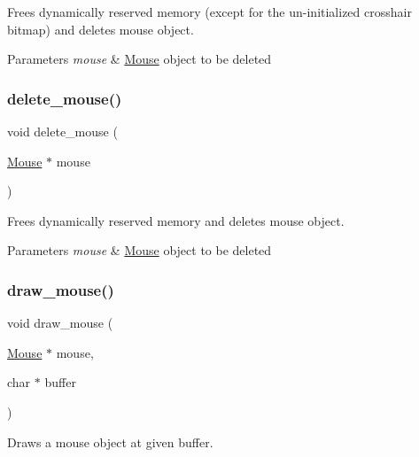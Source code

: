 Frees dynamically reserved memory (except for the un-\/initialized crosshair bitmap) and deletes mouse \textquotesingle{}object\textquotesingle{}. 


\begin{DoxyParams}{Parameters}
{\em mouse} & \hyperlink{struct_mouse}{Mouse} \textquotesingle{}object\textquotesingle{} to be deleted \\
\hline
\end{DoxyParams}
\hypertarget{group__mouse_ga6f0992f39a6073db60ab60697f049082}{}\label{group__mouse_ga6f0992f39a6073db60ab60697f049082} 
\subsubsection{\texorpdfstring{delete\+\_\+mouse()}{delete\_mouse()}}
{\footnotesize\ttfamily void delete\+\_\+mouse (\begin{DoxyParamCaption}\item[{\hyperlink{struct_mouse}{Mouse} $\ast$}]{mouse }\end{DoxyParamCaption})}



Frees dynamically reserved memory and deletes mouse \textquotesingle{}object\textquotesingle{}. 


\begin{DoxyParams}{Parameters}
{\em mouse} & \hyperlink{struct_mouse}{Mouse} \textquotesingle{}object\textquotesingle{} to be deleted \\
\hline
\end{DoxyParams}
\hypertarget{group__mouse_ga533cb6e203c7fbd6e78e3326d32eeb78}{}\label{group__mouse_ga533cb6e203c7fbd6e78e3326d32eeb78} 
\subsubsection{\texorpdfstring{draw\+\_\+mouse()}{draw\_mouse()}}
{\footnotesize\ttfamily void draw\+\_\+mouse (\begin{DoxyParamCaption}\item[{\hyperlink{struct_mouse}{Mouse} $\ast$}]{mouse,  }\item[{char $\ast$}]{buffer }\end{DoxyParamCaption})}



Draws a mouse \textquotesingle{}object\textquotesingle{} at given buffer. 


